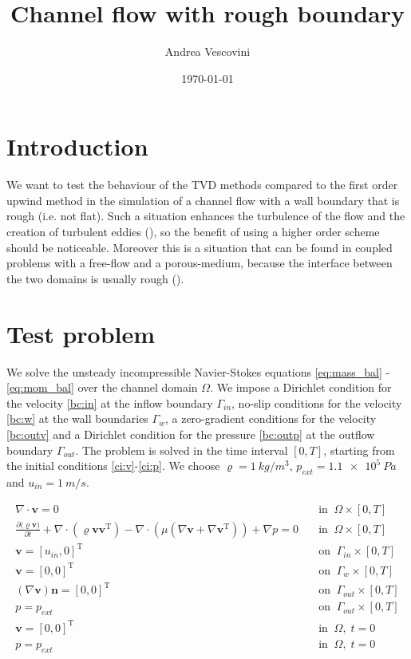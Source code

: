 \documentclass[11pt, a4paper]{article}
\title{\textbf{Channel flow with rough boundary}}
\author{Andrea Vescovini}
\date{\today}
\theoremstyle{definition}
\begin{document}
	\maketitle

\section{Introduction}
We want to test the behaviour of the TVD methods compared to the first order 
upwind method in the simulation of a channel flow with a wall boundary 
that is rough (i.e. not flat). Such a situation enhances the turbulence of the 
flow and the creation of turbulent eddies (\cite{pope}), so the benefit of 
using a higher order scheme should be noticeable. Moreover this is a situation 
that can be found in coupled problems with a free-flow and a porous-medium, 
because the interface between the two domains is usually rough 
(\cite{fetzer}).\\

\section{Test problem}
We solve the unsteady incompressible Navier-Stokes equations 
\eqref{eq:mass_bal} - \eqref{eq:mom_bal} over the channel domain $\Omega$. We 
impose a 
Dirichlet condition for the velocity \eqref{bc:in} at the inflow boundary 
$\Gamma_{in}$, no-slip conditions for the velocity \eqref{bc:w} at  the wall 
boundaries $\Gamma_w$, a zero-gradient conditions for the velocity 
\eqref{bc:outv} and a Dirichlet condition for the pressure \eqref{bc:outp} at 
the outflow boundary $\Gamma_{out}$. The problem is solved in the time interval 
$[0,T]$, starting from the initial conditions \eqref{ci:v}-\eqref{ci:p}. We 
choose $\varrho = \SI{1}{kg/m^3}$, $p_{ext} = \SI{1.1e5}{Pa}$ and $u_{in} = 
\SI{1}{m/s}$.

\begin{align}
\label{eq:mass_bal} \nabla \cdot
\mathbf{v} = 0 \quad &\text{in} \; \; \Omega \times [0, T]\\
\label{eq:mom_bal} \frac{\partial{(\varrho \mathbf{v}})}{\partial t} + \nabla 
\cdot (\varrho \mathbf{v} \mathbf{v^\mathrm{T}}) - \nabla \cdot (\mu (\nabla 
\mathbf{v} + \nabla \mathbf{v}^\mathrm{T})) + 
\nabla p = 0 \quad &\text{in} \; \; \Omega \times [0, T]\\
\label{bc:in} \mathbf{v} = [u_{in}, 0]^\mathrm{T} \quad &\text{on} \; \;
\Gamma_{in} \times [0, T]\\
\label{bc:w} \mathbf{v} = [0, 0]^\mathrm{T} \quad &\text{on} \; \; \Gamma_w 
\times [0, T]\\
\label{bc:outv} (\nabla \mathbf{v}) \mathbf{n} = [0, 0]^\mathrm{T}
\quad &\text{on} \; \; \Gamma_{out} \times [0,T]\\
\label{bc:outp} p = p_{ext} \quad &\text{on} \;\; \Gamma_{out} \times 
[0,T]\\
\label{ci:v} \mathbf{v} = [0, 0]^\mathrm{T} \quad &\text{in} \; \; \Omega, \; 
t=0\\
\label{ci:p} p = p_{ext} \quad &\text{in} \; \; \Omega, \; t=0
\end{align}
\end{document}
